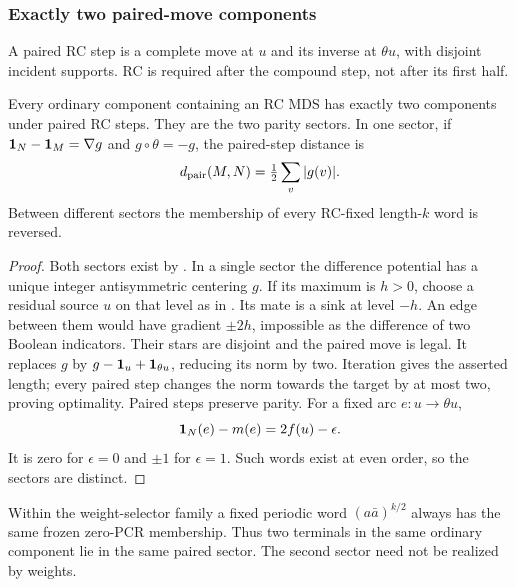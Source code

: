 \subsubsection{Exactly two paired-move components}
A paired RC step is a complete move at $u$ and its inverse at
$\theta u$, with disjoint incident supports. RC is required
after the compound step, not after its first half.

\begin{theorem}\label{thm:two-rc-sectors}
Every ordinary component containing an RC MDS has exactly two
components under paired RC steps. They are the two parity sectors.
In one sector, if $\mathbf 1_N-\mathbf 1_M=\nabla g$ and
$g\circ\theta=-g$, the paired-step distance is
\[
 d_{\rm pair}(M,N)=\tfrac12\sum_v|g(v)|.
\]
Between different sectors the membership of every RC-fixed
length-$k$ word is reversed.
\end{theorem}
\begin{proof}
Both sectors exist by . In a single sector
the difference potential has a unique integer antisymmetric
centering $g$. If its maximum is $h>0$, choose a residual source
$u$ on that level as in . Its mate is a
sink at level $-h$. An edge between them would have gradient
$\pm2h$, impossible as the difference of two Boolean indicators.
Their stars are disjoint and the paired move is legal. It replaces
$g$ by $g-\mathbf 1_u+\mathbf 1_{\theta u}$, reducing its norm by two.
Iteration gives the asserted length; every paired step changes
the norm towards the target by at most two, proving optimality.
Paired steps preserve parity. For a fixed arc $e:u\to\theta u$,
\[
 \mathbf 1_N(e)-m(e)=2f(u)-\epsilon.
\]
It is zero for $\epsilon=0$ and $\pm1$ for $\epsilon=1$.
Such words exist at even order, so the sectors are distinct.
\end{proof}
Within the weight-selector family a fixed periodic word
$(a\bar a)^{k/2}$ always has the same frozen zero-PCR membership.
Thus two terminals in the same ordinary component lie in the
same paired sector. The second sector need not be realized by weights.

